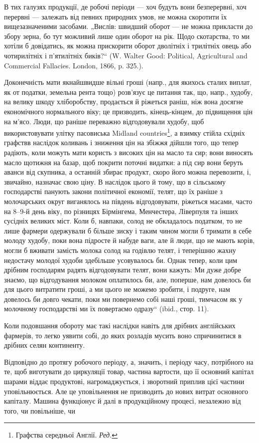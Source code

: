 В тих галузях продукції, де робочі періоди — хоч будуть вони безперервні,
хоч перервні — залежать від певних природних умов, не можна
скоротити їх вищезазначеними засобами. „Вислів: швидший оборот — не
можна прикласти до збору зерна, бо тут можливий лише один оборот
на рік. Щодо скотарства, то ми хотіли б довідатись, як можна прискорити
оборот дволітніх і трилітніх овець або чотирилітніх і п’ятилітніх
биків?“ (W. Walter Good: Political, Agricultural and Commercial Fallacies.
London, 1866, p. 325.).

Доконечність мати якнайшвидше вільні гроші (напр., для якихось сталих
виплат, як от податки, земельна рента тощо) розв’язує це питання
так, що, напр., худобу, на велику шкоду хліборобству, продається й
ріжеться раніш, ніж вона досягне економічного нормального віку; це
призводить, кінець-кінцем, до підвищення цін на м’ясо. Люди, що раніше
переважно відгодовували худобу, щоб використовувати улітку пасовиська
Midland countries\footnote*{
Графства середньої Англії. \emph{Ред.}
}, а взимку стійла східніх графств\dotfill в наслідок коливань
і зниження цін на збіжжя дійшли того, що тепер радіють, коли
можуть мати користь з високих цін на масло та сир; вони виносять масло
щотижня на базар, щоб покрити поточні видатки: а під сир вони беруть
аванси від скупника, а останній збирає продукт, скоро його можна перевозити,
і, звичайно, назначає свою ціну. В наслідок цього й тому, що
в сільському господарстві панують закони політичної економії, телят, що
їх раніше з молочарських округ виганялось на південь відгодовувати,
ріжеться масами, часто на 8--9-й день віку, по різницях Бірмінгема, Менчестера,
Ліверпуля та інших сусідніх великих міст. Коли б, навпаки,
солод не обкладалось податком, то не лише фармери одержували б більше
зиску і таким чином могли б тримати в себе молоду худобу, поки вона
підросте й набуде ваги, але й люди, що не мають корів, могли б вживати
замість молока солод на годівлю телят, і теперішню жахну недостачу
молодої худоби здебільше усовувалось би. Однак тепер, коли цим
дрібним господарям радять відгодовувати телят, вони кажуть: Ми дуже
добре знаємо, що відгодування молоком оплатилось би, але, поперше,
нам довелось би для цього витратити гроші, а ми цього не можемо зробити,
і подруге, нам довелось би довго чекати, поки ми повернемо собі
наші гроші, тимчасом як у молочному господарстві ми їх повертаємо
одразу“ (ibid., стор. 11).

Коли подовшання обороту має такі наслідки навіть для дрібних англійських
фармерів, то легко уявити собі, до яких розладів мусить воно
спричинитися в дрібних селян континенту.

Відповідно до протягу робочого періоду, а, значить, і періоду часу,
потрібного на те, щоб виготувати до циркуляції товар, частина вартости,
що її основний капітал шарами віддає продуктові, нагромаджується, і
зворотний приплив цієї частини уповільнюється. Але це уповільнення не
призводить до нових витрат основного капіталу. Машина функціонує й
далі в продукційному процесі, незалежно від того, чи повільніше, чи
\parbreak{}  %
